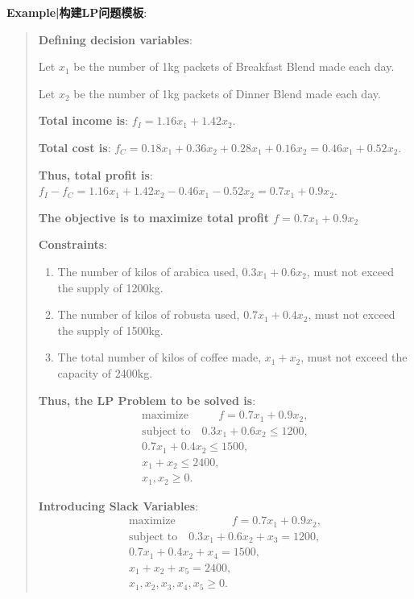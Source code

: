 \documentclass[9pt]{article}
\begin{document}
\textbf{Example|构建LP问题模板}:

\vspace{-10pt}
\begin{multicols}{2}
\begin{quote}
    \color{gray}
    \fontsize{7pt}{4pt}\selectfont
    \textbf{Defining decision variables}:

    \quad Let $x_1$ be the number of 1kg packets of Breakfast Blend made each day.

    \quad Let $x_2$ be the number of 1kg packets of Dinner Blend made each day.
    
    \textbf{Total income is}: $f_I = 1.16x_1 + 1.42x_2.$

    \textbf{Total cost is}: $f_C = 0.18x_1 + 0.36x_2 + 0.28x_1 + 0.16x_2 = 0.46x_1 + 0.52x_2.$

    \textbf{Thus, total profit is}:$f_I - f_C = 1.16x_1 + 1.42x_2 - 0.46x_1 - 0.52x_2 = 0.7x_1 + 0.9x_2.$

    \textbf{The objective is to maximize total profit \( f = 0.7x_1 + 0.9x_2 \)}

    \textbf{Constraints}:
    \begin{enumerate}[itemsep=-1pt, topsep=-1pt]
        \item The number of kilos of arabica used, \( 0.3x_1 + 0.6x_2 \), must not exceed the supply of 1200kg.
        \item The number of kilos of robusta used, \( 0.7x_1 + 0.4x_2 \), must not exceed the supply of 1500kg.
        \item The total number of kilos of coffee made, \( x_1 + x_2 \), must not exceed the capacity of 2400kg.
    \end{enumerate}
    
    \textbf{Thus, the LP Problem to be solved is}:
    \[
    \begin{aligned}
        \text{maximize} \qquad \ \ \ f = 0.7x_1 + 0.9x_2, \\
        \text{subject to} \quad 0.3x_1 + 0.6x_2 \leq 1200, \\
        0.7x_1 + 0.4x_2 \leq 1500, \\
        x_1 + x_2 \leq 2400, \\
        x_1, x_2 \geq 0.
    \end{aligned}
    \]
    
    \textbf{Introducing Slack Variables}:  
    \[
    \begin{aligned}
        \text{maximize} \qquad \qquad \quad f = 0.7x_1 + 0.9x_2, \\
        \text{subject to} \quad 0.3x_1 + 0.6x_2 + x_3 = 1200, \\
        0.7x_1 + 0.4x_2 + x_4 = 1500, \\
        x_1 + x_2 + x_5 = 2400, \\
        x_1, x_2, x_3, x_4, x_5 \geq 0.
    \end{aligned}
    \]
\end{quote}
\end{multicols}
\vspace{-10pt}
\end{document}
